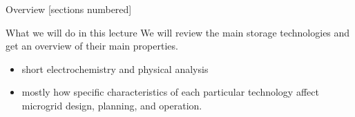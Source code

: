 \titleframe

\begin{frame}{Overview}
  [sections numbered]
  \tableofcontents
\end{frame}

\begin{frame}{What we will do in this lecture}
We will review the main storage technologies and get an overview of their main properties.

\begin{itemize}
  \item short electrochemistry and physical analysis
  \item mostly how specific characteristics of each particular technology affect microgrid design, planning, and operation.
\end{itemize}

\end{frame}


